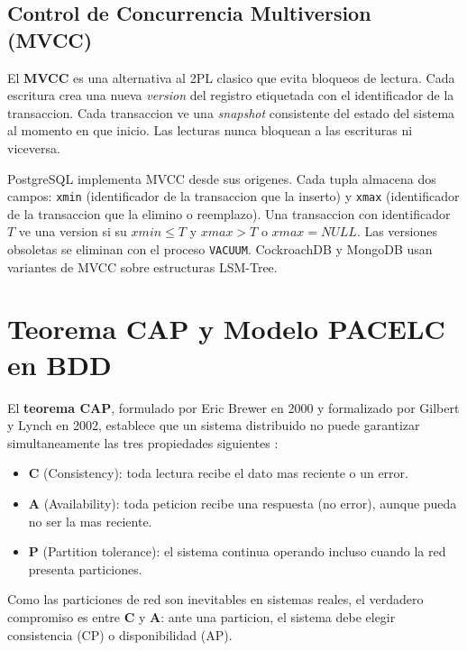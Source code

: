 \documentclass[11pt,a4paper]{article}
\begin{document}
\subsection{Control de Concurrencia Multiversion (MVCC)}

El \textbf{MVCC} es una alternativa al 2PL clasico que evita bloqueos de lectura. Cada escritura crea una nueva \textit{version} del registro etiquetada con el identificador de la transaccion. Cada transaccion ve una \textit{snapshot} consistente del estado del sistema al momento en que inicio. Las lecturas nunca bloquean a las escrituras ni viceversa.

PostgreSQL implementa MVCC desde sus origenes. Cada tupla almacena dos campos: \texttt{xmin} (identificador de la transaccion que la inserto) y \texttt{xmax} (identificador de la transaccion que la elimino o reemplazo). Una transaccion con identificador $T$ ve una version si su $xmin \leq T$ y $xmax > T$ o $xmax = NULL$. Las versiones obsoletas se eliminan con el proceso \texttt{VACUUM}. CockroachDB y MongoDB usan variantes de MVCC sobre estructuras LSM-Tree.

\section{Teorema CAP y Modelo PACELC en BDD}

El \textbf{teorema CAP}, formulado por Eric Brewer en 2000 y formalizado por Gilbert y Lynch en 2002, establece que un sistema distribuido no puede garantizar simultaneamente las tres propiedades siguientes \cite{brewer2012}:

\begin{itemize}[leftmargin=*]
\item \textbf{C} (Consistency): toda lectura recibe el dato mas reciente o un error.
\item \textbf{A} (Availability): toda peticion recibe una respuesta (no error), aunque pueda no ser la mas reciente.
\item \textbf{P} (Partition tolerance): el sistema continua operando incluso cuando la red presenta particiones.
\end{itemize}

Como las particiones de red son inevitables en sistemas reales, el verdadero compromiso es entre \textbf{C} y \textbf{A}: ante una particion, el sistema debe elegir consistencia (CP) o disponibilidad (AP).
\end{document}
